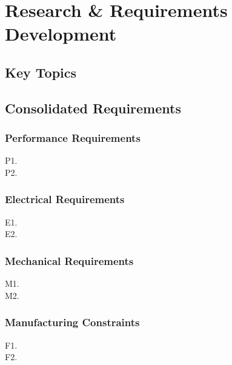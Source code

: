 \documentclass[10pt]{article}
\begin{document}
\section{Research \& Requirements Development}

\subsection{Key Topics}

\subsection{Consolidated Requirements}

\subsubsection{Performance Requirements}
P1. \\
P2.

\subsubsection{Electrical Requirements}
E1. \\
E2.

\subsubsection{Mechanical Requirements}
M1. \\ %
M2. %

\subsubsection{Manufacturing Constraints}
F1. \\ %
F2. %
\end{document}
